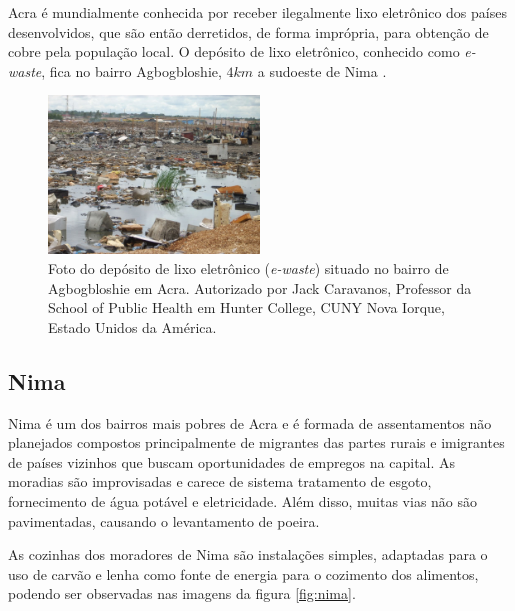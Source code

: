 Acra é mundialmente conhecida por receber ilegalmente lixo 
eletrônico dos países desenvolvidos, que são então derretidos, de forma
imprópria, para obtenção de cobre pela população local. 
O depósito de lixo eletrônico, conhecido como \textit{e-waste}, 
fica no bairro Agbogbloshie, $4 km$ a sudoeste de Nima
\citep{asampong2015}.

\begin{figure}[H]
  \centering
  \includegraphics[width=0.5\textwidth]{../inputs/images/ewaste_jack_caravano.jpg}
  \caption{Foto do depósito de lixo eletrônico (\textit{e-waste}) situado no bairro 
           de Agbogbloshie em Acra. Autorizado por Jack Caravanos, 
           Professor da School of Public Health em Hunter College, CUNY
           Nova Iorque, Estado Unidos da América. \label{fig:ewaste}}
\end{figure}

\subsection{Nima}

Nima é um dos bairros mais pobres de Acra e é formada de assentamentos não 
planejados compostos principalmente de migrantes das partes rurais e 
imigrantes de países vizinhos que buscam oportunidades de empregos na capital. 
As moradias são improvisadas e carece de sistema tratamento de esgoto, 
fornecimento de água potável e eletricidade. Além disso, muitas vias não são 
pavimentadas, causando o levantamento de poeira. 



As cozinhas dos moradores de Nima são instalações simples, adaptadas para o uso
de carvão e lenha como fonte de energia para o cozimento dos alimentos, 
podendo ser observadas nas imagens da figura \ref{fig:nima}.

